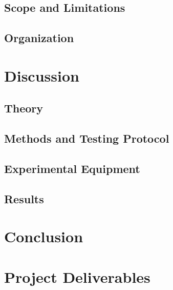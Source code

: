 \documentclass[twocolumn, aps, pra, 12pt, floatfix, showpacs]{revtex4-1}
\begin{document}
\subsection{\label{sec:introduction:scopeandlimitations}Scope and Limitations}


\subsection{\label{sec:introduction:organization}Organization}



\section{\label{sec:discussion}Discussion}


\subsection{\label{sec:discussion:theory}Theory}


\subsection{\label{sec:discussion:testing}Methods and Testing Protocol}


\subsection{\label{sec:discussion:equipment}Experimental Equipment}


\subsection{\label{sec:discussion:results}Results}



\section{\label{sec:conclusion}Conclusion}



\section{\label{sec:projectdeliverables}Project Deliverables}

\end{document}
